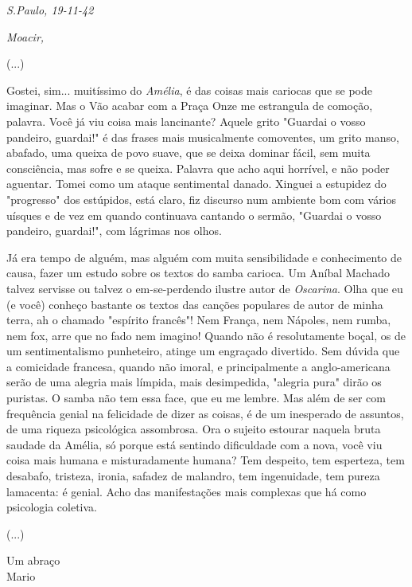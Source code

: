 \begin{flushright}
\emph{S.Paulo, 19-11-42}
\end{flushright}

\emph{Moacir,}

(...)

Gostei, sim... muitíssimo do \emph{Amélia}, é das coisas mais cariocas
que se pode imaginar. Mas o Vão acabar com a Praça Onze me estrangula de
comoção, palavra. Você já viu coisa mais lancinante? Aquele grito
"Guardai o vosso pandeiro, guardai!" é das frases mais musicalmente
comoventes, um grito manso, abafado, uma queixa de povo suave, que se
deixa dominar fácil, sem muita consciência, mas sofre e se queixa.
Palavra que acho aqui horrível, e não poder aguentar. Tomei como um
ataque sentimental danado. Xinguei a estupidez do "progresso" dos
estúpidos, está claro, fiz discurso num ambiente bom com vários uísques
e de vez em quando continuava cantando o sermão, "Guardai o vosso
pandeiro, guardai!", com lágrimas nos olhos.

Já era tempo de alguém, mas alguém com muita sensibilidade e
conhecimento de causa, fazer um estudo sobre os textos do samba carioca.
Um Aníbal Machado talvez servisse ou talvez o em-se-perdendo ilustre
autor de \emph{Oscarina}. Olha que eu (e você) conheço bastante os
textos das canções populares de autor de minha terra, ah o chamado
"espírito francês"! Nem França, nem Nápoles, nem rumba, nem fox, arre
que no fado nem imagino! Quando não é resolutamente boçal, os de um
sentimentalismo punheteiro, atinge um engraçado divertido. Sem dúvida
que a comicidade francesa, quando não imoral, e principalmente a
anglo-americana serão de uma alegria mais límpida, mais desimpedida,
"alegria pura" dirão os puristas. O samba não tem essa face, que eu me
lembre. Mas além de ser com frequência genial na felicidade de dizer as
coisas, é de um inesperado de assuntos, de uma riqueza psicológica
assombrosa. Ora o sujeito estourar naquela bruta saudade da Amélia, só
porque está sentindo dificuldade com a nova, você viu coisa mais humana
e misturadamente humana? Tem despeito, tem esperteza, tem desabafo,
tristeza, ironia, safadez de malandro, tem ingenuidade, tem pureza
lamacenta: é genial. Acho das manifestações mais complexas que há como
psicologia coletiva.

(...)

\begin{flushright}
Um abraço\\
Mario
\end{flushright}


